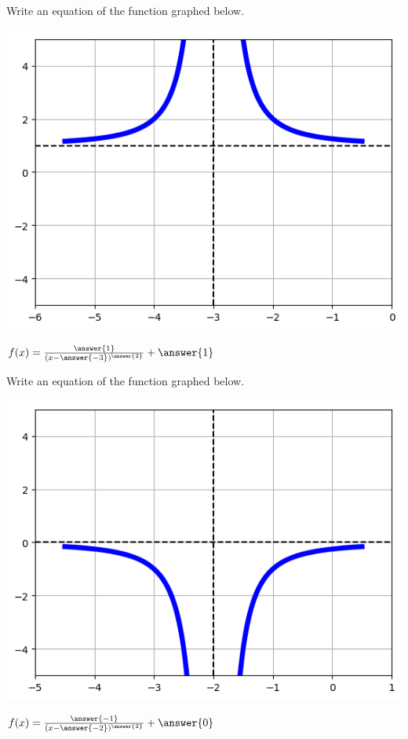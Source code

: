 \documentclass{ximera}
\begin{document}
\begin{question}
Write an equation of the function graphed below. 

	\begin{center}
	    \includegraphics{graphRationalQ3.png}
	\end{center}

$f(x) = \frac{\answer{1}}{(x - \answer{-3})^{\answer{2}}} + \answer{1}$
\end{question}

\begin{question}
Write an equation of the function graphed below. 

	\begin{center}
	    \includegraphics{graphRationalQ4.png}
	\end{center}

$f(x) = \frac{\answer{-1}}{(x - \answer{-2})^{\answer{2}}} + \answer{0}$
\end{question}
\end{document}
